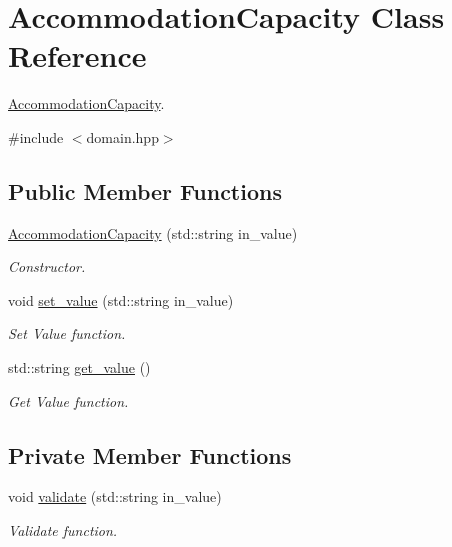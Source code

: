 \hypertarget{classAccommodationCapacity}{}\section{Accommodation\+Capacity Class Reference}
\label{classAccommodationCapacity}


\hyperlink{classAccommodationCapacity}{Accommodation\+Capacity}.  




{\ttfamily \#include $<$domain.\+hpp$>$}

\subsection*{Public Member Functions}
\begin{DoxyCompactItemize}
\item 
\hyperlink{classAccommodationCapacity_a4899dae3f3d82e0e0e51c9c8ebde4ca9}{Accommodation\+Capacity} (std\+::string in\+\_\+value)
\begin{DoxyCompactList}\small\item\em Constructor. \end{DoxyCompactList}\item 
void \hyperlink{classAccommodationCapacity_a309efd033ce21be1adcde126513ef0c2}{set\+\_\+value} (std\+::string in\+\_\+value)
\begin{DoxyCompactList}\small\item\em Set Value function. \end{DoxyCompactList}\item 
std\+::string \hyperlink{classAccommodationCapacity_a141ccf8db79ff5829d72d61039b0bb00}{get\+\_\+value} ()
\begin{DoxyCompactList}\small\item\em Get Value function. \end{DoxyCompactList}\end{DoxyCompactItemize}
\subsection*{Private Member Functions}
\begin{DoxyCompactItemize}
\item 
void \hyperlink{classAccommodationCapacity_aefd847b84494c3cf55597a03ea539f58}{validate} (std\+::string in\+\_\+value)
\begin{DoxyCompactList}\small\item\em Validate function. \end{DoxyCompactList}\end{DoxyCompactItemize}
